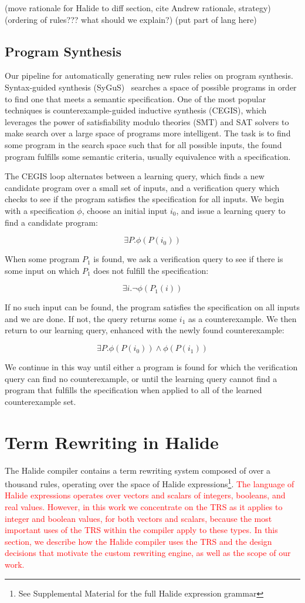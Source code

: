 \documentclass[acmsmall,review]{acmart}\settopmatter{printfolios=true,printccs=false,printacmref=false}
\newcommand{\modified}[1]{\textcolor{red}{{#1}}}
\begin{document}
(move rationale for Halide to diff section, cite Andrew rationale, strategy)
(ordering of rules??? what should we explain?)
(put part of lang here)
\subsection{Program Synthesis}
\label{sec:program-synthesis}
Our pipeline for automatically generating new rules relies on program synthesis.
Syntax-guided synthesis (SyGuS)~\cite{sygus} searches a space of possible programs in order to find one that meets
a semantic specification.  One of the most popular techniques is counterexample-guided
inductive synthesis (CEGIS), which leverages the power of satisfiability modulo theories
(SMT) and SAT solvers to make search over a large space of programs more intelligent.
The task is to find some program in the search space such that for all possible
inputs, the found program fulfills some semantic criteria, usually equivalence with
a specification.

The CEGIS loop alternates between a learning query, which finds a new candidate program over a small set of inputs, and a verification query which checks to see if the program satisfies the specification for all inputs. We begin with a specification $\phi$, choose an initial input $i_0$, and issue a learning query to find a candidate program:

$$\exists P . \phi(P(i_0))$$

When some program $P_1$ is found, we ask a verification query to see if there is some input on which $P_1$ does not fulfill the specification:

$$\exists i . \neg \phi(P_1(i))$$

If no such input can be found, the program satisfies the specification on all inputs and we are done. If not, the query returns some $i_1$ as a counterexample. We then return to our learning query, enhanced with the newly found counterexample:

$$\exists P . \phi(P(i_0)) \wedge \phi(P(i_1))$$

We continue in this way until either a program is found for which the verification query can find no counterexample, or until the learning query cannot find a program that fulfills the specification when applied to all of the learned counterexample set.

\section{Term Rewriting in Halide}
The Halide compiler contains a term rewriting system composed of over a thousand
rules, operating over the space of Halide expressions\footnote{See Supplemental Material for
the full Halide expression grammar}.  \modified{The language of Halide expressions
operates over vectors and scalars of integers, booleans, and real values.  However, in
this work we concentrate on the TRS as it applies to integer and boolean values, for
both vectors and scalars, because the most important uses of the TRS within the compiler
apply to these types.  In this section, we describe how the Halide compiler uses the TRS
and the design decisions that motivate the custom rewriting engine, as well as the scope
of our work.}
\end{document}
